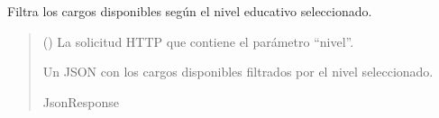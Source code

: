 \documentclass[letterpaper,10pt,spanish]{sphinxmanual}
\begin{document}
\begin{fulllineitems}

\pysigstartsignatures
{}
\pysigstopsignatures
\sphinxAtStartPar
Filtra los cargos disponibles según el nivel educativo seleccionado.
\begin{quote}\begin{description}
\sphinxAtStartPar
{} () \textendash{} La solicitud HTTP que contiene el parámetro “nivel”.

\sphinxAtStartPar
Un JSON con los cargos disponibles filtrados por el nivel seleccionado.

\sphinxAtStartPar
JsonResponse

\end{description}\end{quote}

\end{fulllineitems}
\end{document}
